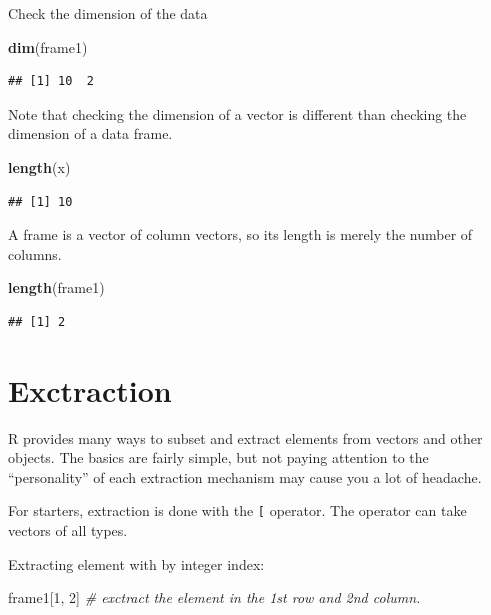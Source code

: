 \documentclass[]{book}
\newenvironment{Shaded}{\begin{snugshade}}{\end{snugshade}}
\newcommand{\KeywordTok}[1]{\textcolor[rgb]{0.13,0.29,0.53}{\textbf{{#1}}}}
\newcommand{\DecValTok}[1]{\textcolor[rgb]{0.00,0.00,0.81}{{#1}}}
\newcommand{\CommentTok}[1]{\textcolor[rgb]{0.56,0.35,0.01}{\textit{{#1}}}}
\newcommand{\NormalTok}[1]{{#1}}
\theoremstyle{definition}
\theoremstyle{definition}
\theoremstyle{remark}
\begin{document}
Check the dimension of the data

\begin{Shaded}
\begin{Highlighting}[]
\KeywordTok{dim}\NormalTok{(frame1)                             }
\end{Highlighting}
\end{Shaded}

\begin{verbatim}
## [1] 10  2
\end{verbatim}

Note that checking the dimension of a vector is different than checking
the dimension of a data frame.

\begin{Shaded}
\begin{Highlighting}[]
\KeywordTok{length}\NormalTok{(x)}
\end{Highlighting}
\end{Shaded}

\begin{verbatim}
## [1] 10
\end{verbatim}

A frame is a vector of column vectors, so its length is merely the
number of columns.

\begin{Shaded}
\begin{Highlighting}[]
\KeywordTok{length}\NormalTok{(frame1) }
\end{Highlighting}
\end{Shaded}

\begin{verbatim}
## [1] 2
\end{verbatim}

\section{Exctraction}\label{exctraction}

R provides many ways to subset and extract elements from vectors and
other objects. The basics are fairly simple, but not paying attention to
the ``personality'' of each extraction mechanism may cause you a lot of
headache.

For starters, extraction is done with the \texttt{{[}} operator. The
operator can take vectors of all types.

Extracting element with by integer index:

\begin{Shaded}
\begin{Highlighting}[]
\NormalTok{frame1[}\DecValTok{1}\NormalTok{, }\DecValTok{2}\NormalTok{]  }\CommentTok{# exctract the element in the 1st row and 2nd column.}
\end{Highlighting}
\end{Shaded}
\end{document}
